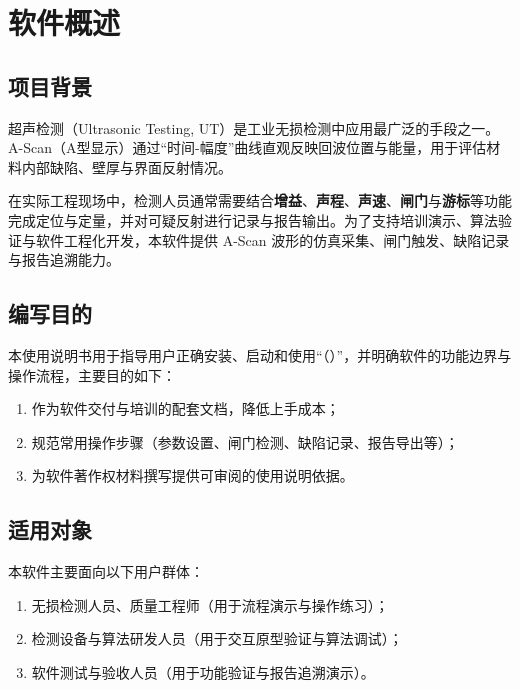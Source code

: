 %
%
\section{软件概述}

\subsection{项目背景}
\par
超声检测（Ultrasonic Testing, UT）是工业无损检测中应用最广泛的手段之一。A-Scan（A型显示）通过“时间-幅度”曲线直观反映回波位置与能量，用于评估材料内部缺陷、壁厚与界面反射情况。
\par
在实际工程现场中，检测人员通常需要结合\textbf{增益}、\textbf{声程}、\textbf{声速}、\textbf{闸门}与\textbf{游标}等功能完成定位与定量，并对可疑反射进行记录与报告输出。为了支持培训演示、算法验证与软件工程化开发，本软件提供 A-Scan 波形的仿真采集、闸门触发、缺陷记录与报告追溯能力。

\subsection{编写目的}
\par
本使用说明书用于指导用户正确安装、启动和使用“\SoftwareName（\Version）”，并明确软件的功能边界与操作流程，主要目的如下：
\begin{enumerate}
	\item 作为软件交付与培训的配套文档，降低上手成本；
	\item 规范常用操作步骤（参数设置、闸门检测、缺陷记录、报告导出等）；
	\item 为软件著作权材料撰写提供可审阅的使用说明依据。
\end{enumerate}

\subsection{适用对象}
\par
本软件主要面向以下用户群体：
\begin{enumerate}
	\item 无损检测人员、质量工程师（用于流程演示与操作练习）；
	\item 检测设备与算法研发人员（用于交互原型验证与算法调试）；
	\item 软件测试与验收人员（用于功能验证与报告追溯演示）。
\end{enumerate}

